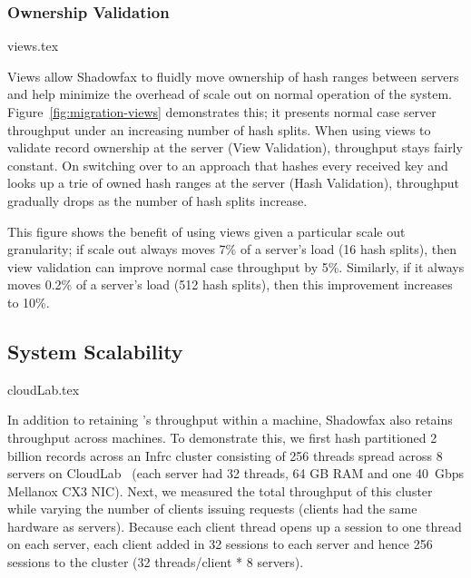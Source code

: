 \subsubsection{Ownership Validation}
\label{sec:eval:migration:views}

 {views.tex}

Views allow Shadowfax to fluidly move ownership of hash ranges between
servers and help minimize the overhead of scale out on normal
operation of the system.
%
Figure~\ref{fig:migration-views} demonstrates this; it presents normal
case server throughput under an increasing number of hash splits.
%
When using views to validate record ownership at the
server (View Validation), throughput stays fairly constant.
%
On switching over to an approach that hashes every received key and
looks up a trie of owned hash ranges at the server (Hash Validation),
throughput gradually drops as the number of hash splits increase.

This figure shows the benefit of using views given a particular scale
out granularity; if scale out always moves 7\% of a server's load (16
hash splits), then view validation can improve normal case
throughput by 5\%.
%
Similarly, if it always moves 0.2\% of a server's load (512 hash
splits), then this improvement increases to 10\%.

\subsection{System Scalability}
\label{sec:eval:system-scalability}

 {cloudLab.tex}

%
In addition to retaining \faster's throughput within a machine,
Shadowfax also retains throughput across machines.
%
To demonstrate this, we first hash partitioned 2 billion records across an
Infrc cluster consisting of 256 threads spread across 8 servers on
CloudLab~\cite{cloudlab} (each server had 32 threads, 64 GB RAM and
one 40~Gbps Mellanox CX3 NIC).
%
Next, we measured the total throughput of this cluster while varying the
number
of clients issuing requests (clients had the same hardware as servers).
%
Because each client thread opens up a session to one thread on each server,
each client added in 32 sessions to each server and hence 256 sessions
to the cluster (32 threads/client * 8 servers).

